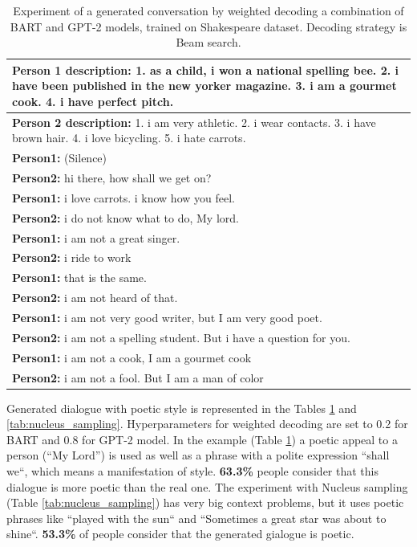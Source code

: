 \begin{table}[H]
\centering
 \begin{tabular}{|p{14cm}|} 
 \hline
 \textbf{Person 1 description:} 1. as a child, i won a national spelling bee. 2. i have been published in the new yorker magazine. 3. i am a gourmet cook. 4. i have perfect pitch. \\
 \hline
 \textbf{Person 2 description:} 1. i am very athletic. 2. i wear contacts. 3. i have brown hair. 4. i love bicycling. 5. i hate carrots. \\
 \hline
 \textbf{Person1:} (Silence) \\
 \textbf{Person2:} hi there, how shall we get on?  \\ 
 \textbf{Person1:} i love carrots. i know how you feel. \\
 \textbf{Person2:} i do not know what to do, My lord. \\
 \textbf{Person1:} i am not a great singer. \\
 \textbf{Person2:} i ride to work \\
 \textbf{Person1:} that is the same. \\
 \textbf{Person2:} i am not heard of that. \\
 \textbf{Person1:} i am not very good writer, but I am very good poet. \\
 \textbf{Person2:} i am not a spelling student. But i have a question for you. \\
 \textbf{Person1:} i am not a cook, I am a gourmet cook \\
 \textbf{Person2:} i am not a fool. But I am a man of color  \\
 \hline
 \end{tabular}
 \caption{Experiment of a generated conversation by weighted decoding a combination of BART and GPT-2 models, trained on Shakespeare dataset. Decoding strategy is Beam search.}
\label{tab:poetic_shakespear}
\end{table}

Generated dialogue with poetic style is represented in the Tables \ref{tab:poetic_shakespear} and \ref{tab:nucleus_sampling}. Hyperparameters for weighted decoding are set to 0.2 for BART and 0.8 for GPT-2 model. In the example (Table \ref{tab:poetic_shakespear}) a poetic appeal to a person (``My Lord'') is used as well as a phrase with a polite expression ``shall we``, which means a manifestation of style. \textbf{63.3\%} people consider that this dialogue is more poetic than the real one. The experiment with Nucleus sampling (Table \ref{tab:nucleus_sampling}) has very big context problems, but it uses poetic phrases like ``played with the sun`` and ``Sometimes a great star was about to shine``. \textbf{53.3\%} of people consider that the generated gialogue is poetic. 

